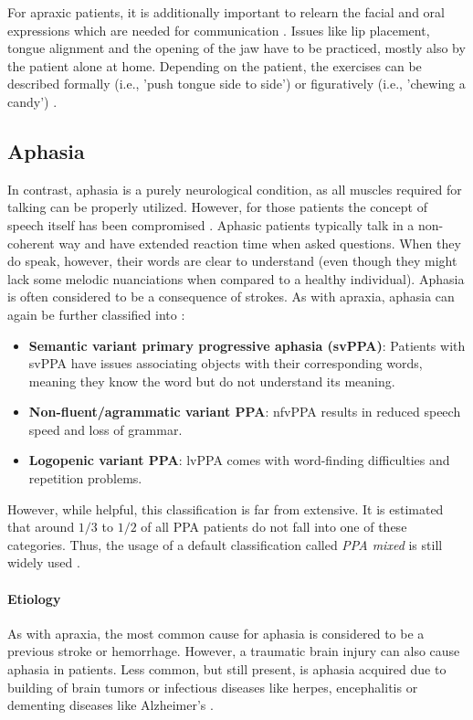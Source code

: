 \documentclass[draft,final]{vutinfth} %
\begin{document}
For apraxic patients, it is additionally important to relearn the facial and oral expressions which are needed for communication \cite{ogar2005apraxia}. Issues like lip placement, tongue alignment and the opening of the jaw have to be practiced, mostly also by the patient alone at home. Depending on the patient, the exercises can be described formally (i.e., 'push tongue side to side') or figuratively (i.e., 'chewing a candy') \cite{proestler2023}.
\subsection{Aphasia}
\label{sec:Aphasia}
In contrast, aphasia is a purely neurological condition, as all muscles required for talking can be properly utilized. However, for those patients the concept of speech itself has been compromised \cite{clark2003aphasia}. Aphasic patients typically talk in a non-coherent way and have extended reaction time when asked questions. When they do speak, however, their words are clear to understand (even though they might lack some melodic nuanciations when compared to a healthy individual). Aphasia is often considered to be a consequence of strokes. As with apraxia, aphasia can again be further classified into \cite{ulugut2022natural}:
\begin{itemize}
\item \textbf{Semantic variant primary progressive aphasia (svPPA)}: Patients with svPPA have issues associating objects with their corresponding words, meaning they know the word but do not understand its meaning.
\item \textbf{Non-fluent/agrammatic variant PPA}: nfvPPA results in reduced speech speed and loss of grammar.
\item \textbf{Logopenic variant PPA}: lvPPA comes with word-finding difficulties and repetition problems. 
\end{itemize}

However, while helpful, this classification is far from extensive. It is estimated that around $1/3$ to $1/2$ of all PPA patients do not fall into one of these categories. Thus, the usage of a default classification called \emph{PPA mixed} is still widely used \cite{ulugut2022natural}.

\paragraph{Etiology} As with apraxia, the most common cause for aphasia is considered to be a previous stroke or hemorrhage. However, a traumatic brain injury can also cause aphasia in patients. Less common, but still present, is aphasia acquired due to building of brain tumors or infectious diseases like herpes, encephalitis or dementing diseases like Alzheimer's \cite{clark2003aphasia}.
\end{document}

